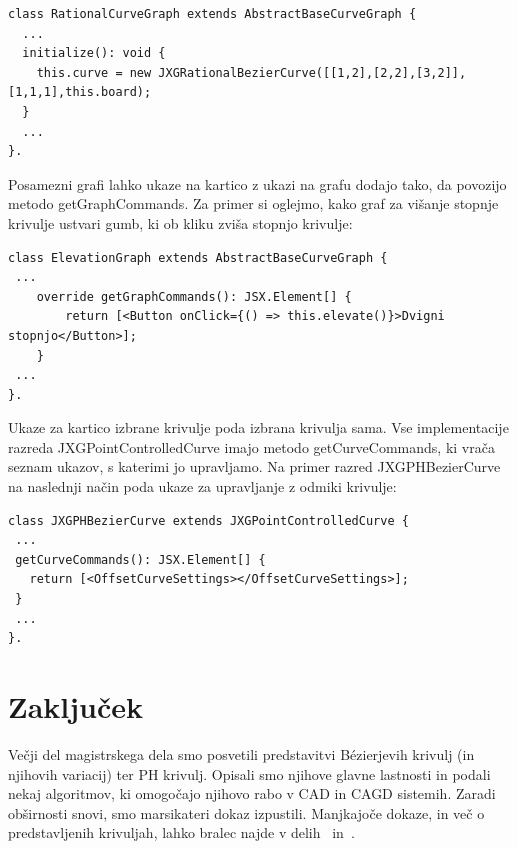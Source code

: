 \documentclass[isrm2, tisk]{fmfdelo}
\begin{document}
    \begin{lstlisting}[label={lst:ghdfg}]
class RationalCurveGraph extends AbstractBaseCurveGraph {
  ...
  initialize(): void {
    this.curve = new JXGRationalBezierCurve([[1,2],[2,2],[3,2]],[1,1,1],this.board);
  }
  ...
}.
    \end{lstlisting}
    Posamezni grafi lahko ukaze na kartico z ukazi na grafu dodajo tako, da povozijo metodo getGraphCommands.
    Za primer si oglejmo, kako graf za višanje stopnje krivulje ustvari gumb, ki ob kliku zviša stopnjo krivulje:
    \begin{lstlisting}[label={lst:ghdfssg}]
 class ElevationGraph extends AbstractBaseCurveGraph {
 ...
    override getGraphCommands(): JSX.Element[] {
        return [<Button onClick={() => this.elevate()}>Dvigni stopnjo</Button>];
    }
 ...
}.
    \end{lstlisting}
    Ukaze za kartico izbrane krivulje poda izbrana krivulja sama.
    Vse implementacije razreda JXGPointControlledCurve imajo metodo getCurveCommands, ki vrača seznam ukazov, s katerimi jo upravljamo.
    Na primer razred JXGPHBezierCurve na naslednji način poda ukaze za upravljanje z odmiki krivulje:
    \begin{lstlisting}[label={lst:ghdfs1sg}]
class JXGPHBezierCurve extends JXGPointControlledCurve {
 ...
 getCurveCommands(): JSX.Element[] {
   return [<OffsetCurveSettings></OffsetCurveSettings>];
 }
 ...
}.
    \end{lstlisting}


    \section{Zaključek}
    Večji del magistrskega dela smo posvetili predstavitvi Bézierjevih krivulj (in njihovih variacij) ter PH krivulj.
    Opisali smo njihove glavne lastnosti in podali nekaj algoritmov, ki omogočajo njihovo rabo v CAD in CAGD sistemih.
    Zaradi obširnosti snovi, smo marsikateri dokaz izpustili.
    Manjkajoče dokaze, in več o predstavljenih krivuljah, lahko bralec najde v delih~\cite{farouki} in~\cite{stability-rational}.
\end{document}
